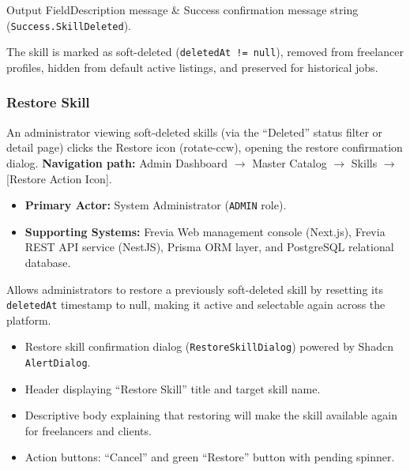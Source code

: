 \begin{specdatatable}{Output Field}{Description}
message & Success confirmation message string (\texttt{Success.SkillDeleted}).\\ \hline
\end{specdatatable}

\noindent The skill is marked as soft-deleted (\texttt{deletedAt != null}), removed from freelancer profiles, hidden from default active listings, and preserved for historical jobs.

\subsubsection{ Restore Skill}

An administrator viewing soft-deleted skills (via the ``Deleted'' status filter or detail page) clicks the Restore icon (rotate-ccw), opening the restore confirmation dialog.\newline
\textbf{Navigation path:} Admin Dashboard $\rightarrow$ Master Catalog $\rightarrow$ Skills $\rightarrow$ [Restore Action Icon].


\begin{itemize}[leftmargin=1.6em,topsep=3pt,itemsep=2pt,parsep=0pt,label=$\bullet$]
    \item \textbf{Primary Actor:} System Administrator (\texttt{ADMIN} role).
    \item \textbf{Supporting Systems:} Frevia Web management console (Next.js), Frevia REST API service (NestJS), Prisma ORM layer, and PostgreSQL relational database.
\end{itemize}

\noindent Allows administrators to restore a previously soft-deleted skill by resetting its \texttt{deletedAt} timestamp to null, making it active and selectable again across the platform.

\begin{itemize}[leftmargin=1.6em,topsep=3pt,itemsep=2pt,parsep=0pt,label=$\bullet$]
    \item Restore skill confirmation dialog (\texttt{RestoreSkillDialog}) powered by Shadcn \texttt{AlertDialog}.
    \item Header displaying ``Restore Skill'' title and target skill name.
    \item Descriptive body explaining that restoring will make the skill available again for freelancers and clients.
    \item Action buttons: ``Cancel'' and green ``Restore'' button with pending spinner.
\end{itemize}

